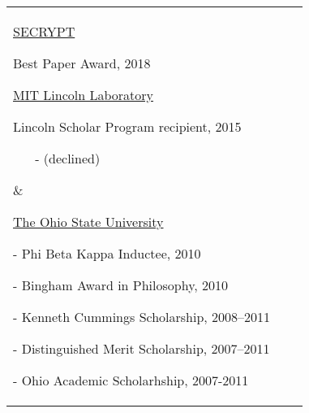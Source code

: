 \documentclass[10pt]{article}
\newcommand{\halfblankline}{\quad\vspace{-0.5\baselineskip}\pagebreak[3]}
\begin{document}
\begin{tabular}[t]{@{}p{\textwidth-\rcollength-3.5\spacewidth}@{}p{\spacewidth}@{}p{\rcollength}}%

\parbox{\textwidth-\rcollength-\spacewidth}{%
\href{http://www.secrypt.icete.org/PreviousAwards.aspx}{SECRYPT}
\begin{innerlist}
\item[] Best Paper Award, 2018
\end{innerlist}

\halfblankline

\href{http://www.ll.mit.edu}{MIT Lincoln Laboratory}
\begin{innerlist}
\item[] Lincoln Scholar Program recipient, 2015
\vspace{-0.5em}
\begin{itemize}
	\item[-] (declined)
\end{itemize}
\end{innerlist}
}

&

\parbox{1.5\rcollength}{%
\href{http://www.osu.edu}{The Ohio State University}
\begin{innerlist}
\item[-] Phi Beta Kappa Inductee, 2010
\item[-] Bingham Award in Philosophy, 2010
\item[-] Kenneth Cummings Scholarship, 2008--2011
\item[-] Distinguished Merit Scholarship, 2007--2011
\item[-] Ohio Academic Scholarhship, 2007-2011
\end{innerlist}
}

\end{tabular}
\end{document}
